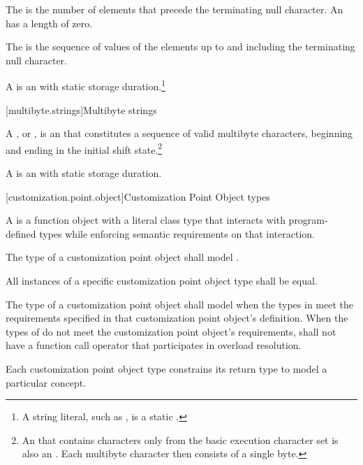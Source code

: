 \pnum
The 
is the number of elements that
precede the terminating null character.
An 
has a length of zero.

\pnum
The 
is the sequence of values of the
elements up to and including the terminating null character.

\pnum
A 
is an \ntbs{} with
static storage duration.\footnote{A string literal, such as
,
is a static \ntbs{}.}

[multibyte.strings]{Multibyte strings}

%
\pnum
A ,
or \ntmbs{},
is an \ntbs{} that constitutes a
sequence of valid multibyte characters, beginning and ending in the initial
shift state.\footnote{An \ntbs{} that contains characters only from the
basic execution character set is also an \ntmbs{}.
Each multibyte character then
consists of a single byte.}

\pnum
A 
is an \ntmbs{} with static storage duration.

[customization.point.object]{Customization Point Object types}

\pnum
A  is a function object
with a literal class type that interacts with program-defined types while
enforcing semantic requirements on that interaction.

\pnum
The type of a customization point object shall model
.

\pnum
All instances of a specific customization point object type shall
be equal.

\pnum
The type  of a customization point object shall model
when the types in  meet the requirements specified in that
customization point object's definition. When the types of  do
not meet the customization point object's requirements,  shall not have
a function call operator that participates in overload resolution.

\pnum
Each customization point object type constrains its return type to model a
particular concept.

